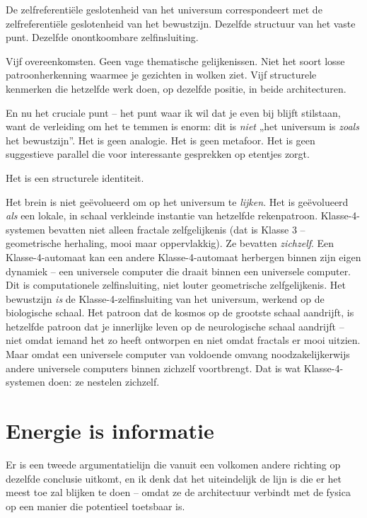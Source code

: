 \documentclass[11pt, twoside, openright]{book}
\begin{document}
De zelfreferentiële geslotenheid van het universum correspondeert met de zelfreferentiële geslotenheid van het bewustzijn. Dezelfde structuur van het vaste punt. Dezelfde onontkoombare zelfinsluiting.

Vijf overeenkomsten. Geen vage thematische gelijkenissen. Niet het soort losse patroonherkenning waarmee je gezichten in wolken ziet. Vijf structurele kenmerken die hetzelfde werk doen, op dezelfde positie, in beide architecturen.

En nu het cruciale punt -- het punt waar ik wil dat je even bij blijft stilstaan, want de verleiding om het te temmen is enorm: dit is \textit{niet} „het universum is \textit{zoals} het bewustzijn”. Het is geen analogie. Het is geen metafoor. Het is geen suggestieve parallel die voor interessante gesprekken op etentjes zorgt.

Het is een structurele identiteit.

Het brein is niet geëvolueerd om op het universum te \textit{lijken}. Het is geëvolueerd \textit{als} een lokale, in schaal verkleinde instantie van hetzelfde rekenpatroon. Klasse-4-systemen bevatten niet alleen fractale zelfgelijkenis (dat is Klasse 3 -- geometrische herhaling, mooi maar oppervlakkig). Ze bevatten \textit{zichzelf}. Een Klasse-4-automaat kan een andere Klasse-4-automaat herbergen binnen zijn eigen dynamiek -- een universele computer die draait binnen een universele computer. Dit is computationele zelfinsluiting, niet louter geometrische zelfgelijkenis. Het bewustzijn \textit{is} de Klasse-4-zelfinsluiting van het universum, werkend op de biologische schaal. Het patroon dat de kosmos op de grootste schaal aandrijft, is hetzelfde patroon dat je innerlijke leven op de neurologische schaal aandrijft -- niet omdat iemand het zo heeft ontworpen en niet omdat fractals er mooi uitzien. Maar omdat een universele computer van voldoende omvang noodzakelijkerwijs andere universele computers binnen zichzelf voortbrengt. Dat is wat Klasse-4-systemen doen: ze nestelen zichzelf.

\section*{Energie is informatie}

Er is een tweede argumentatielijn die vanuit een volkomen andere richting op dezelfde conclusie uitkomt, en ik denk dat het uiteindelijk de lijn is die er het meest toe zal blijken te doen -- omdat ze de architectuur verbindt met de fysica op een manier die potentieel toetsbaar is.
\end{document}
